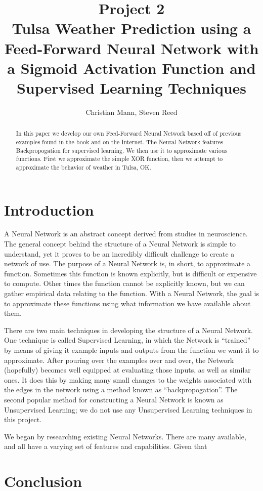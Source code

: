 \documentclass{article}
\title{Project 2\\Tulsa Weather Prediction using a Feed-Forward Neural Network with a Sigmoid Activation Function and Supervised Learning Techniques}
\author{Christian Mann, Steven Reed}
\begin{document}
\maketitle

\begin{multicols}{2}

\begin{abstract}
In this paper we develop our own Feed-Forward Neural Network based off of previous examples found in the book and on the Internet. The Neural Network features Backpropogation for supervised learning. We then use it to approximate various functions. First we approximate the simple XOR function, then we attempt to approximate the behavior of weather in Tulsa, OK.
\end{abstract}

\section{Introduction}

A Neural Network is an abstract concept derived from studies in neuroscience. The general concept behind the structure of a Neural Network is simple to understand, yet it proves to be an incredibly difficult challenge to create a network of use. The purpose of a Neural Network is, in short, to approximate a function. Sometimes this function is known explicitly, but is difficult or expensive to compute. Other times the function cannot be explicitly known, but we can gather empirical data relating to the function. With a Neural Network, the goal is to approximate these functions using what information we have available about them.

There are two main techniques in developing the structure of a Neural Network. One technique is called Supervised Learning, in which the Network is ``trained'' by means of giving it example inputs and outputs from the function we want it to approximate. After pouring over the examples over and over, the Network (hopefully) becomes well equipped at evaluating those inputs, as well as similar ones. It does this by making many small changes to the weights associated with the edges in the network using a method known as ``backpropogation''. The second popular method for constructing a Neural Network is known as Unsupervised Learning; we do not use any Unsupervised Learning techniques in this project.

We began by researching existing Neural Networks. There are many available, and all have a varying set of features and capabilities. Given that 

\section{Conclusion}

\end{multicols}
	
\end{document}
